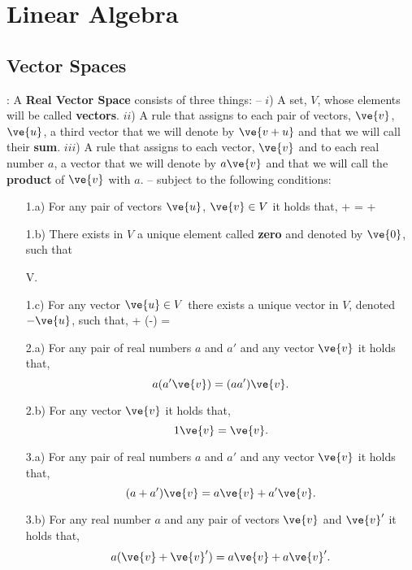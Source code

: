 \chapter{Linear Algebra}


\section{Vector Spaces}

:
A {\bf Real Vector Space} consists of three things:
-- $i$) A set, $V$, whose elements will be called {\bf vectors}.
$ii$) A rule that assigns to each pair of vectors, $\ve{v}$,
$\ve{u}$, a third vector that we will denote by $\ve{v+u}$ and that we will call
their {\bf sum}. $iii$) A rule that assigns to each vector, $\ve{v}$ and
to each real number $a$, a vector that we will denote by $a\ve{v}$ and
that we will call the {\bf product} of $\ve{v}$ with $a$. -- subject to
the following conditions:

\begin{itemize}

\item[1.a)] For any pair of vectors $\ve{u}$, $\ve{v} \in V$
it holds that,
\beq
{} +  =  + 
\eeq

\item[1.b)] There exists in $V$ a unique element called {\bf zero} and denoted by $\ve{0}$,
such that 

\beq
{} \;\forall {}  \in V.
\eeq

\item[1.c)] For any vector $\ve{u} \in V$ there exists a unique
vector in $V$, denoted $-\ve{u}$, such that,
\beq
{} + (-) = 
\eeq

\item[2.a)] For any pair of real numbers $a$ and $a'$ and any vector 
$\ve{v}$ it holds that,
\[
a(a'\ve{v}) = (aa')\ve{v}.
\]

\item[2.b)] For any vector 
$\ve{v}$ it holds that,
\[
1\ve{v} = \ve{v}.
\]

\item[3.a)] For any pair of real numbers $a$ and $a'$ and any vector 
$\ve{v}$ it holds that,
\[
(a+a')\ve{v} = a\ve{v} + a'\ve{v}.
\]

\item[3.b)] For any real number $a$ and any pair of vectors
$\ve{v}$ and $\ve{v}'$ it holds that,
\[
a(\ve{v}  + \ve{v}') = a\ve{v} + a\ve{v}'.
\]

\end{itemize}

